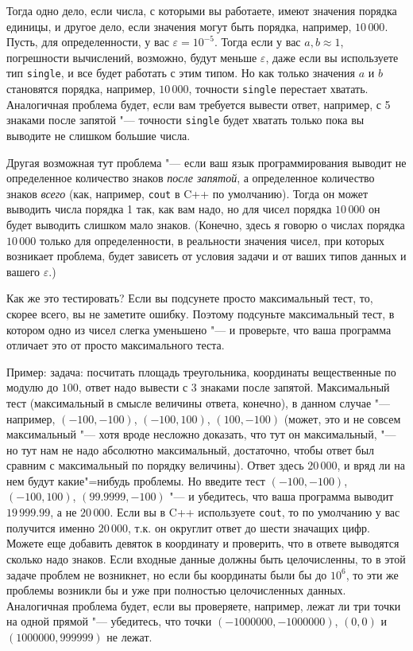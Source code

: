 Тогда одно дело, если числа, с которыми вы работаете, имеют значения порядка единицы, 
и другое дело, если значения могут быть порядка, например, $10\,000$. 
Пусть, для определенности, у вас $\varepsilon=10^{-5}$. Тогда если у вас $a,b\approx 1$,
погрешности вычислений, возможно, будут меньше $\varepsilon$, даже если вы используете
тип \verb`single`, и все будет работать с этим типом. 
Но как только значения $a$ и $b$ становятся порядка, например, $10\,000$, 
точности \verb`single` перестает хватать. 
Аналогичная проблема будет, если вам требуется вывести ответ, например, с 5 знаками после запятой
"--- точности \verb`single` будет хватать только пока вы выводите не слишком большие числа.

Другая возможная тут проблема "--- если ваш язык программирования выводит
не определенное количество знаков \textit{после запятой}, а определенное количество
знаков \textit{всего} (как, например, \verb`cout` в C++ по умолчанию).
Тогда он может выводить числа порядка 1 так, как вам надо, но для чисел порядка $10\,000$ 
он будет выводить слишком мало знаков. (Конечно, здесь я говорю о числах порядка $10\,000$
только для определенности, в реальности значения чисел, при которых возникает проблема,
будет зависеть от условия задачи и от ваших типов данных и вашего $\varepsilon$.)

Как же это тестировать? Если вы подсунете просто максимальный тест, то, скорее всего, 
вы не заметите ошибку. Поэтому подсуньте максимальный тест, в котором одно из чисел
слегка уменьшено "--- и проверьте, что ваша программа отличает это от просто максимального теста.

Пример: задача: посчитать площадь треугольника, координаты вещественные по модулю до $100$, 
ответ надо вывести с 3 знаками после запятой. Максимальный тест (максимальный в смысле 
величины ответа, конечно), в данном случае "--- например, 
$(-100,-100)$, $(-100,100)$, $(100,-100)$ (может, это и не совсем максимальный "--- хотя вроде несложно доказать,
что тут он максимальный, "--- но тут нам не надо абсолютно максимальный, достаточно,
чтобы ответ был сравним с максимальный по порядку величины). Ответ здесь $20\,000$,
и вряд ли на нем будут какие"=нибудь проблемы.
Но введите тест $(-100,-100)$, $(-100,100)$, $(99.9999,-100)$ "--- и убедитесь,
что ваша программа выводит $19\,999.99$, а не $20\,000$. 
Если вы в C++ используете \verb`cout`, то по умолчанию у вас получится именно $20\,000$,
т.к. он округлит ответ до шести значащих цифр.
Можете еще добавить девяток в координату и проверить, что в ответе выводятся сколько надо знаков.
Если входные данные должны быть целочисленны, то в этой задаче проблем не возникнет,
но если бы координаты были бы до $10^6$, то эти же проблемы возникли бы и уже при полностью 
целочисленных данных. Аналогичная проблема будет, если вы проверяете, например, лежат ли
три точки на одной прямой "--- убедитесь, что точки $(-1000000,-1000000)$, $(0,0)$ и $(1000000,999999)$
не лежат.

